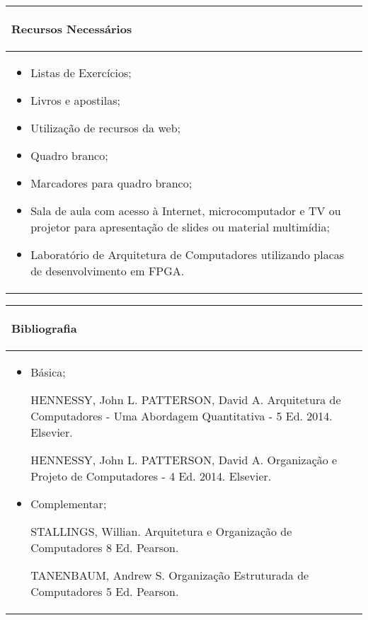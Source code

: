 \begin{table}[h!]
\centering
\begin{small} 
 
\setlength{\tabcolsep}{3pt} 
\begin{tabular}{|p{15cm}|}\hline

\begin{center}\textbf{Recursos Necessários}\end{center}\\ \hline
\begin{itemize} 
  \item Listas de Exercícios;
  \item Livros e apostilas;
  \item Utilização de recursos da web;
  \item Quadro branco;
  \item Marcadores para quadro branco;
  \item Sala de aula com acesso à Internet, microcomputador e TV ou projetor para apresentação de slides ou material multimídia;
  \item Laboratório de Arquitetura de Computadores utilizando placas de desenvolvimento em FPGA.
\end{itemize}
 \\ \hline

\end{tabular} 
\end{small}
\label{dadosinstituicao}
\end{table}


\begin{table}[h!]
\centering
\begin{small} 
\setlength{\tabcolsep}{3pt} 
\begin{tabular}{|p{15cm}|}\hline

\begin{center}\textbf{Bibliografia}\end{center}\\ \hline
\begin{itemize} 
  \item Básica;
  
  HENNESSY, John L. PATTERSON, David A. Arquitetura de Computadores - Uma Abordagem Quantitativa - 5 Ed. 2014. Elsevier.
  
  HENNESSY, John L. PATTERSON, David A. Organização e Projeto de Computadores - 4 Ed. 2014. Elsevier.
  
  \item Complementar;
  
  STALLINGS, Willian. Arquitetura e Organização de Computadores 8 Ed. Pearson.

  TANENBAUM, Andrew S. Organização Estruturada de Computadores 5 Ed. Pearson.  

\end{itemize}
 \\ \hline

\end{tabular} 
\end{small}
\label{dadosinstituicao}
\end{table}
